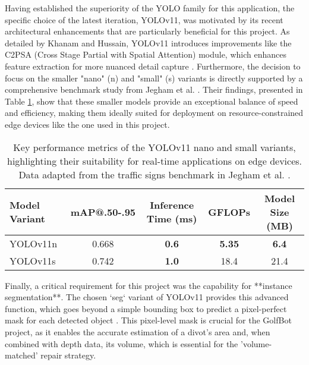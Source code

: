 Having established the superiority of the YOLO family for this application, the specific choice of the latest iteration, YOLOv11, was motivated by its recent architectural enhancements that are particularly beneficial for this project. As detailed by Khanam and Hussain, YOLOv11 introduces improvements like the C2PSA (Cross Stage Partial with Spatial Attention) module, which enhances feature extraction for more nuanced detail capture \cite{khanam2024yolov11_overview}. Furthermore, the decision to focus on the smaller "nano" (n) and "small" (s) variants is directly supported by a comprehensive benchmark study from Jegham et al. \cite{jegham2024evaluating}. Their findings, presented in Table \ref{tab:yolov11_performance}, show that these smaller models provide an exceptional balance of speed and efficiency, making them ideally suited for deployment on resource-constrained edge devices like the one used in this project.

\begin{table}[h!]
    \centering
    \caption[Performance of Selected YOLOv11 Variants for Edge Deployment.]
    {Key performance metrics of the YOLOv11 nano and small variants, highlighting their suitability for real-time applications on edge devices. Data adapted from the traffic signs benchmark in Jegham et al. \cite{jegham2024evaluating}.}
    \label{tab:yolov11_performance}
    \begin{tabular}{l c c c c}
        \hline
        \textbf{Model Variant} & \textbf{mAP@.50-.95} & \textbf{Inference Time (ms)} & \textbf{GFLOPs} & \textbf{Model Size (MB)} \\
        \hline
        YOLOv11n & 0.668 & \textbf{0.6} & \textbf{5.35} & \textbf{6.4} \\
        YOLOv11s & 0.742 & \textbf{1.0} & 18.4 & 21.4 \\
        \hline
    \end{tabular}
\end{table}

Finally, a critical requirement for this project was the capability for **instance segmentation**. The chosen `seg` variant of YOLOv11 provides this advanced function, which goes beyond a simple bounding box to predict a pixel-perfect mask for each detected object \cite{wu2019recent, sapkota2024comparing}. This pixel-level mask is crucial for the GolfBot project, as it enables the accurate estimation of a divot's area and, when combined with depth data, its volume, which is essential for the 'volume-matched' repair strategy.

